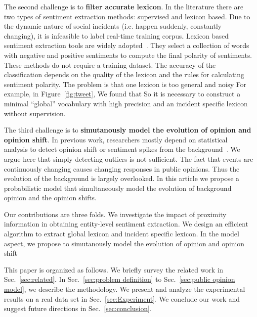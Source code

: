 \documentclass[runningheads]{llncs}
\begin{document}
The second challenge is to \textbf{filter accurate lexicon}. 
In the literature there are two types of sentiment extraction methods: supervised and lexicon based.
Due to the dynamic nature of social incidents (i.e. happen suddenly, constantly changing), it is infeasible to label real-time training corpus. %
Lexicon based sentiment extraction tools are widely adopted~\cite{sentistrength2010,Thelwall2012lexicon,Ortega2013lexicon}. They select a collection of words with negative and positive sentiments to compute the final polarity of sentiments. These methods do not
require a training dataset. The accuracy of the classification depends on the quality of the lexicon and the rules for calculating sentiment polarity. The problem is that one lexicon is too general and noisy %
For example, in Figure~\ref{fig:tweet}, We found that 
 So it is necessary to construct a minimal ``global'' vocabulary with high precision and an incident specific lexicon without supervision.

The third challenge is to \textbf{simutanously model the evolution of opinion and opinion shift}.
In previous work, researchers mostly depend on statistical analysis to detect opinion shift or sentiment spikes from the background~\cite{Giachanou2016sentichange,Giachanou2017sentichange,Giachanou2016sentitime}.
We argue here that simply detecting outliers is not sufficient.
The fact that events are continuously changing causes changing responses in public opinions.
Thus the evolution of the background is largely overlooked.
In this article we propose a probabilistic model that simultaneously model the evolution of background opinion and the opinion shifts.

Our contributions are three folds. 
We investigate the impact of proximity information in obtaining entity-level sentiment extraction.
We design an efficient algorithm to extract global lexicon and incident specific lexicon.
In the model aspect, we propose to simutanously model the evolution of opinion and opinion shift

This paper is organized as follows. We briefly survey the related work in Sec.~\ref{sec:related}. In Sec.~\ref{sec:problem definition} to Sec.~\ref{sec:public opinion model}, we describe the methodology. We present and analyze the experimental results on a real data set in Sec.~\ref{sec:Experiment}. We conclude our work and suggest future directions in Sec.~\ref{sec:conclusion}.
\end{document}
